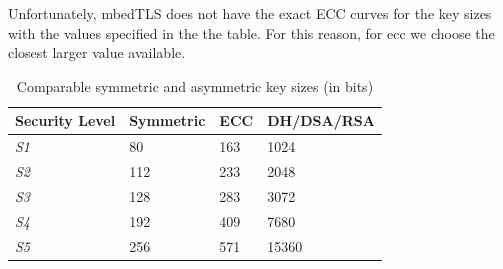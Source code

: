 \documentclass{llncs}
\begin{document}
Unfortunately, mbedTLS does not have
the exact ECC curves for the  key sizes with the values specified in the the table. For this reason, for \gls{ecc}
we choose the closest larger value available.


\begin{table}[]
\begin{tabular}{|l|l|l|l|}
\hline
Security Level & Symmetric & ECC & DH/DSA/RSA \\ \hline
\textit{S1}    & 80        & 163 & 1024       \\ \hline
\textit{S2}    & 112       & 233 & 2048       \\ \hline
\textit{S3}    & 128       & 283 & 3072       \\ \hline
\textit{S4}    & 192       & 409 & 7680       \\ \hline
\textit{S5}    & 256       & 571 & 15360      \\ \hline
\end{tabular}
\centering \caption{\label{table:ecc-key-sizes} Comparable symmetric and asymmetric key sizes (in bits)}
\end{table}
\end{document}

